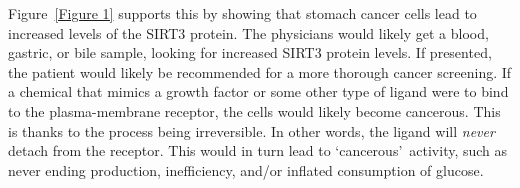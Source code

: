 \documentclass[11pt]{article}
\begin{document}
\begin{enumerate}
\begin{enumerate}
            Figure~\ref{Figure 1} supports this by showing that stomach cancer cells lead to increased levels of the SIRT3 protein.
            The physicians would likely get a blood, gastric, or bile sample, looking for increased SIRT3 protein levels.
            If presented, the patient would likely be recommended for a more thorough cancer screening.
            If a chemical that mimics a growth factor or some other type of ligand were to bind to the plasma-membrane receptor, the cells would likely become cancerous.
            This is thanks to the process being irreversible.
            In other words, the ligand will \textit{never} detach from the receptor.
            This would in turn lead to \lq cancerous\rq\ activity, such as never ending production, inefficiency, and/or inflated consumption of glucose.
        \end{enumerate}
    \end{enumerate}
\end{document}
